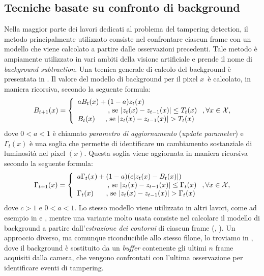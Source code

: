 \subsection{Tecniche basate su confronto di background}
\label{background}
Nella maggior parte dei lavori dedicati al problema del tampering detection, il metodo principalmente utilizzato consiste nel confrontare ciascun frame con un modello che viene calcolato a partire dalle osservazioni precedenti.
Tale metodo \`e ampiamente utilizzato in vari ambiti della visione artificiale e prende il nome di \textit{background subtraction}.
Una tecnica generale di calcolo del background \`e presentata in \cite{aksay2007camera}.
Il valore del modello di background per il pixel $x$\ \`e calcolato, in maniera ricorsiva, secondo la seguente formula:
\[
\label{eq:background}
B_{t + 1}(x)=\left\{ \begin{array} {lcl}
aB_t(x)+ (1-a)z_t(x) \\
\mbox{\hspace{1.5cm}, se } |z_t(x) - z_{t-1}(x)|\leq T_t(x) \\
B_t(x) \mbox{\hspace{0.5cm}, se } |z_t(x) - z_{t-1}(x)|>T_t(x)\end{array} \right. , \forall x \in \mathcal{X},
\]
dove $0 < a < 1$ \`e chiamato \textit{parametro di aggiornamento} (\textit{update parameter}) e $\Gamma_t(x)$ \`e una soglia che permette di identificare un cambiamento sostanziale di luminosit\`a nel pixel $(x)$. 
 Questa soglia viene aggiornata in maniera ricorsiva secondo la seguente formula:
  \[
  \label{eq:backgroundThreshUpd}
  \Gamma_{t + 1}(x)=\left\{ \begin{array} {lcl}
  a\Gamma_t(x)+ (1-a)(c |z_t(x) - B_t(x)|) \\
  \mbox{\hspace{1.5cm}, se	}  |z_t(x) - z_{t-1}(x)|\leq \Gamma_t(x) \\
  \Gamma_t(x) \mbox{	\hspace{0.5cm}, se	}  |z_t(x) - z_{t-1}(x)|>\Gamma_t(x) \end{array} \right. ,\forall x \in \mathcal{X},
  \]
  dove $c > 1$ e $0<a<1$.
  Lo stesso modello viene utilizzato in altri lavori, come ad esempio in \cite{saglam2009real} e \cite{tsesmelis2013tamper}, mentre una variante molto usata consiste nel calcolare il modello di background a partire dall'\textit{estrazione dei contorni} di ciascun frame (\cite{harasse2004automated}, \cite{gil2007automatic}).
  Un approccio diverso, ma comunque riconducibile allo stesso filone, lo troviamo in \cite{ribnick2006real}, dove il background \`e sostituito da un \textit{buffer} contenente gli ultimi $n$ frame acquisiti dalla camera, che vengono confrontati con l'ultima osservazione per identificare eventi di tampering.
